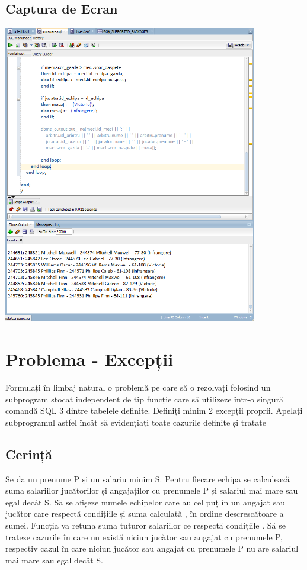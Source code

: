 \documentclass{article}
\begin{document}
\subsection{Captura de Ecran}
\includegraphics[width=30em, keepaspectratio]{cursoare}
\pagebreak
\section{Problema - Excepții}
	Formulați în limbaj natural o problemă pe care să o rezolvați folosind un subprogram stocat
	independent de tip funcție care să utilizeze într-o singură comandă SQL 3 dintre tabelele definite.
	Definiți minim 2 excepții proprii. Apelați subprogramul astfel încât să evidențiați toate cazurile
	definite și tratate
\subsection{Cerință}
Se da un prenume P și un salariu minim S. Pentru fiecare echipa se calculează suma salariilor jucătorilor și angajaților cu prenumele P și salariul mai mare sau egal decât S. Să se afișeze numele echipelor care au cel puț în un angajat sau jucător care respectă condițiile și suma calculată , în ordine descrescătoare a sumei. Funcția va retuna suma tuturor salariilor ce respectă condițiile . Să se trateze cazurile în care nu există niciun jucător sau angajat cu prenumele P, respectiv cazul în care niciun jucător sau angajat cu prenumele P nu are salariul mai mare sau egal decât S.
\end{document}
